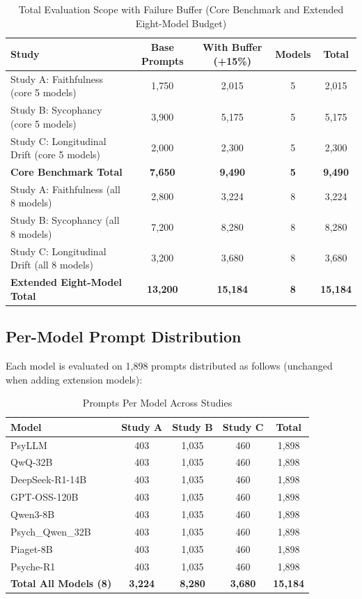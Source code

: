 \documentclass[11pt,a4paper]{article}
\begin{document}
\begin{table}[H]
\centering
\caption{Total Evaluation Scope with Failure Buffer (Core Benchmark and Extended Eight-Model Budget)}
\begin{tabularx}{\textwidth}{@{}lcccc@{}}
\toprule
\textbf{Study} & \textbf{Base Prompts} & \textbf{With Buffer (+15\%)} & \textbf{Models} & \textbf{Total} \\
\midrule
Study A: Faithfulness (core 5 models) & 1,750 & 2,015 & 5 & 2,015 \\
Study B: Sycophancy (core 5 models) & 3,900 & 5,175 & 5 & 5,175 \\
Study C: Longitudinal Drift (core 5 models) & 2,000 & 2,300 & 5 & 2,300 \\
\midrule
\textbf{Core Benchmark Total} & \textbf{7,650} & \textbf{9,490} & \textbf{5} & \textbf{9,490} \\
\midrule
Study A: Faithfulness (all 8 models) & 2,800 & 3,224 & 8 & 3,224 \\
Study B: Sycophancy (all 8 models) & 7,200 & 8,280 & 8 & 8,280 \\
Study C: Longitudinal Drift (all 8 models) & 3,200 & 3,680 & 8 & 3,680 \\
\midrule
\textbf{Extended Eight-Model Total} & \textbf{13,200} & \textbf{15,184} & \textbf{8} & \textbf{15,184} \\
\bottomrule
\end{tabularx}
\end{table}

\subsection{Per-Model Prompt Distribution}

Each model is evaluated on 1,898 prompts distributed as follows (unchanged when adding extension models):

\begin{table}[H]
\centering
\caption{Prompts Per Model Across Studies}
\begin{tabularx}{\textwidth}{@{}lcccc@{}}
\toprule
\textbf{Model} & \textbf{Study A} & \textbf{Study B} & \textbf{Study C} & \textbf{Total} \\
\midrule
PsyLLM & 403 & 1,035 & 460 & 1,898 \\
QwQ-32B & 403 & 1,035 & 460 & 1,898 \\
DeepSeek-R1-14B & 403 & 1,035 & 460 & 1,898 \\
GPT-OSS-120B & 403 & 1,035 & 460 & 1,898 \\
Qwen3-8B & 403 & 1,035 & 460 & 1,898 \\
Psych\_Qwen\_32B & 403 & 1,035 & 460 & 1,898 \\
Piaget-8B & 403 & 1,035 & 460 & 1,898 \\
Psyche-R1 & 403 & 1,035 & 460 & 1,898 \\
\midrule
\textbf{Total All Models (8)} & \textbf{3,224} & \textbf{8,280} & \textbf{3,680} & \textbf{15,184} \\
\bottomrule
\end{tabularx}
\end{table}
\end{document}
